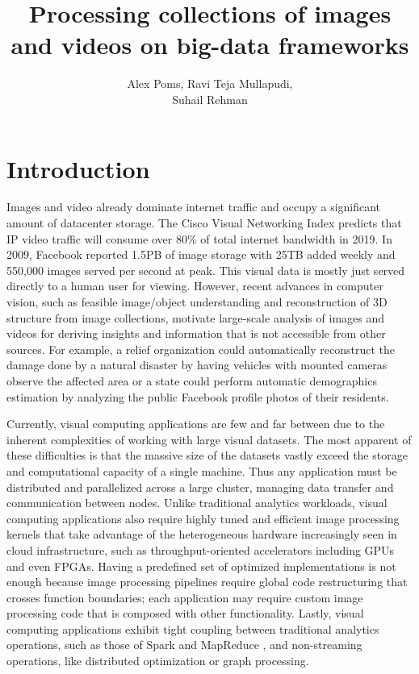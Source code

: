 \documentclass[tog]{acmsiggraph}
\title{Processing collections of images and videos on big-data frameworks}
\author{Alex Poms, Ravi Teja Mullapudi, \\Suhail Rehman}
\begin{document}
\maketitle

\begin{abstract}
\end{abstract}

\section{Introduction}
Images and video already dominate internet traffic and occupy a significant
amount of datacenter storage. The Cisco Visual Networking Index predicts that
IP video traffic will consume over 80\% of total internet bandwidth in 2019. In
2009, Facebook reported 1.5PB of image storage with 25TB added weekly and
550,000 images served per second at peak. This visual data is mostly just
served directly to a human user for viewing. However, recent advances in
computer vision, such as feasible image/object understanding and reconstruction
of 3D structure from image collections, motivate large-scale analysis of images
and videos for deriving insights and information that is not accessible from
other sources. For example, a relief organization could automatically
reconstruct the damage done by a natural disaster by having vehicles with
mounted cameras observe the affected area or a state could perform automatic
demographics estimation by analyzing the public Facebook profile photos of
their residents.

Currently, visual computing applications are few and far between due to the
inherent complexities of working with large visual datasets. The most apparent
of these difficulties is that the massive size of the datasets vastly exceed
the storage and computational capacity of a single machine. Thus any
application must be distributed and parallelized across a large cluster,
managing data transfer and communication between nodes. Unlike traditional
analytics workloads, visual computing applications also require highly tuned
and efficient image processing kernels that take advantage of the heterogeneous
hardware increasingly seen in cloud infrastructure, such as throughput-oriented
accelerators including GPUs and even FPGAs. Having a predefined set of
optimized implementations is not enough because image processing pipelines
require global code restructuring that crosses function boundaries; each
application may require custom image processing code that is composed with
other functionality. Lastly, visual computing applications exhibit tight
coupling between traditional analytics operations, such as those of Spark
\cite{zaharia2012resilient} and MapReduce \cite{dean2008mapreduce}, and
non-streaming operations, like distributed optimization or graph processing.
\end{document}
